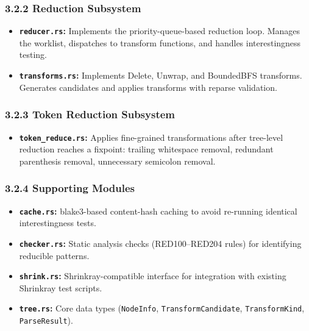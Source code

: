 \documentclass[
  letterpaper,
]{article}
\providecommand{\tightlist}{%
  \setlength{\itemsep}{0pt}\setlength{\parskip}{0pt}}
\begin{document}
\subsubsection{3.2.2 Reduction Subsystem}\label{reduction-subsystem}

\begin{itemize}
\tightlist
\item
  \textbf{\texttt{reducer.rs}:} Implements the priority-queue-based
  reduction loop. Manages the worklist, dispatches to transform
  functions, and handles interestingness testing.
\item
  \textbf{\texttt{transforms.rs}:} Implements Delete, Unwrap, and
  BoundedBFS transforms. Generates candidates and applies transforms
  with reparse validation.
\end{itemize}

\subsubsection{3.2.3 Token Reduction
Subsystem}\label{token-reduction-subsystem}

\begin{itemize}
\tightlist
\item
  \textbf{\texttt{token\_reduce.rs}:} Applies fine-grained
  transformations after tree-level reduction reaches a fixpoint:
  trailing whitespace removal, redundant parenthesis removal,
  unnecessary semicolon removal.
\end{itemize}

\subsubsection{3.2.4 Supporting Modules}\label{supporting-modules}

\begin{itemize}
\tightlist
\item
  \textbf{\texttt{cache.rs}:} blake3-based content-hash caching to avoid
  re-running identical interestingness tests.
\item
  \textbf{\texttt{checker.rs}:} Static analysis checks (RED100--RED204
  rules) for identifying reducible patterns.
\item
  \textbf{\texttt{shrink.rs}:} Shrinkray-compatible interface for
  integration with existing Shrinkray test scripts.
\item
  \textbf{\texttt{tree.rs}:} Core data types (\texttt{NodeInfo},
  \texttt{TransformCandidate}, \texttt{TransformKind},
  \texttt{ParseResult}).
\end{itemize}
\end{document}
